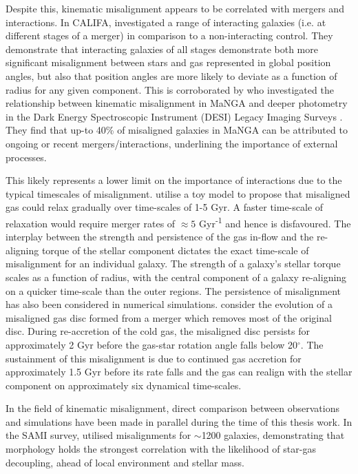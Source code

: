 Despite this, kinematic misalignment appears to be correlated with mergers and interactions. In CALIFA, \citet[][]{barrera2015} investigated a range of interacting galaxies (i.e. at different stages of a merger) in comparison to a non-interacting control. They demonstrate that interacting galaxies of all stages demonstrate both more significant misalignment between stars and gas represented in global position angles, but also that position angles are more likely to deviate as a function of radius for any given component. This is corroborated by \citet{li_decoupling2019} who investigated the relationship between kinematic misalignment in MaNGA and deeper photometry in the Dark Energy Spectroscopic Instrument (DESI) Legacy Imaging Surveys \citep{dey2019}. They find that up-to 40\% of misaligned galaxies in MaNGA can be attributed to ongoing or recent mergers/interactions, underlining the importance of external processes. 

This likely represents a lower limit on the importance of interactions due to the typical timescales of misalignment. \citet{davis2016} utilise a toy model to propose that misaligned gas could relax gradually over time-scales of 1-5 Gyr. A faster time-scale of relaxation would require merger rates of $\approx 5$ Gyr\textsuperscript{-1} and hence is disfavoured. The interplay between the strength and persistence of the gas in-flow and the re-aligning torque of the stellar component dictates the exact time-scale of misalignment for an individual galaxy. The strength of a galaxy's stellar torque scales as a function of radius, with the central component of a galaxy re-aligning on a quicker time-scale than the outer regions. The persistence of misalignment has also been considered in numerical simulations. \citet{vdvoort2015} consider the evolution of a misaligned gas disc formed from a merger which removes most of the original disc. During re-accretion of the cold gas, the misaligned disc persists for approximately 2 Gyr before the gas-star rotation angle falls below 20$^{\circ}$. The sustainment of this misalignment is due to continued gas accretion for approximately 1.5 Gyr before its rate falls and the gas can realign with the stellar component on approximately six dynamical time-scales. 

In the field of kinematic misalignment, direct comparison between observations and simulations have been made in parallel during the time of this thesis work. In the SAMI survey, \citet{bryant2019} utilised misalignments for $\sim$1200 galaxies, demonstrating that morphology holds the strongest correlation with the likelihood of star-gas decoupling, ahead of local environment and stellar mass. 


